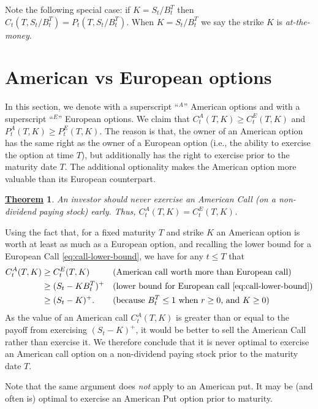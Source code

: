 \documentclass[12pt]{book}
\numberwithin{equation}{chapter}
\theoremstyle{plain}
\newtheorem{theorem}{\underline{Theorem}}
\numberwithin{theorem}{section}
\theoremstyle{definition}
\numberwithin{exercise}{chapter}
\let\oldendproof\endproof
\renewenvironment{proof}[1][\proofname]{%
  \oldproof[\scshape\underline{#1}]%
}{\oldendproof}
\newcommand{\<}{\langle}
\renewcommand{\>}{\rangle}
\renewcommand{\(}{\left(}
\renewcommand{\)}{\right)}
\renewcommand{\[}{\left[}
\renewcommand{\]}{\right]}
\theoremstyle{definition}
\numberwithin{question}{section}
\begin{document}
\noindent
Note the following special case: if $K = S_t/B_t^T$ then $C_t(T,S_t/B_t^T) = P_t(T,S_t/B_t^T)$.  When $K = S_t/B_t^T$ we say the strike $K$ is \textit{at-the-money}.

\section{American vs European options}
In this section, we denote with a superscript ``${}^A$'' American options and with a superscript ``${}^E$'' European options.
We claim that $C_t^A(T,K) \geq C_t^E(T,K)$ and $P_t^A(T,K) \geq P_t^E(T,K)$. 
The reason is that, the owner of an American option has the same right as the owner of a European option (i.e., the ability to exercise the option at time $T$), but additionally has the right to exercise prior to the maturity date $T$.  The additional optionality makes the American option more valuable than its European counterpart.

\begin{theorem}
An investor should never exercise an American Call (on a non-dividend paying stock) early.  Thus, $C_t^A(T,K) = C_t^E(T,K)$.
\end{theorem}

\begin{proof}
Using the fact that, for a fixed maturity $T$ and strike $K$ an American option is worth at least as much as a European option, and recalling the lower bound for a European Call \eqref{eq:call-lower-bound}, we have for any $t \leq T$ that
\begin{align} \label{eq:am_call_exercise}
C_t^A(T,K) 
	&\geq C_t^E(T,K) &
	&\text{(American call worth more than European call)}\\
	&\geq ( S_t - K B_t^T )^+ &
	&\text{(lower bound for European call \eqref{eq:call-lower-bound})}\\
	&\geq (S_t - K)^+ . &
	&\text{(because $B_t^T \leq 1$ when $r \geq 0$, and $K \geq 0$)}\\
\end{align}
As the value of an American call $C_t^A(T,K)$ is greater than or equal to the payoff from exercising $(S_t-K)^+$, it would be better to sell the American Call rather than exercise it.  We therefore conclude that it is never optimal to exercise an American call option on a non-dividend paying stock prior to the maturity date $T$.
\end{proof}

\noindent
Note that the same argument does \textit{not} apply to an American put.  It may be (and often is) optimal to exercise an American Put option prior to maturity.
\end{document}
